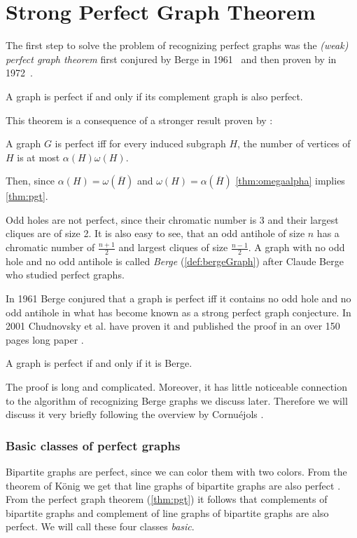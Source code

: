 \section{Strong Perfect Graph Theorem}
\label{sec:SPGT}

The first step to solve the problem of recognizing perfect graphs was the \emph{(weak) perfect graph theorem} first conjured by Berge in 1961~\cite{CB61} and then proven by \Lovasz in 1972~\cite{LL72}.

\begin{theorem}
	\label{thm:pgt}
	A graph is perfect if and only if its complement graph is also perfect.
\end{theorem}

This theorem is a consequence of a stronger result proven by \Lovasz:
\begin{theorem}
	\label{thm:omegaalpha}
	A graph $G$ is perfect iff for every induced subgraph $H$, the number of vertices of $H$ is at most $\alpha(H)\omega(H)$. 
\end{theorem}

Then, since $\alpha(H) = \omega(\overline{H})$ and $\omega(H) = \alpha(\overline{H})$ \cref{thm:omegaalpha} implies \cref{thm:pgt}.

Odd holes are not perfect, since their chromatic number is 3 and their largest cliques are of size 2. It is also easy to see, that an odd antihole of size $n$ has a chromatic number of $\frac{n+1}{2}$ and largest cliques of size $\frac{n-1}{2}$. A graph with no odd hole and no odd antihole is called \emph{Berge} (\cref{def:bergeGraph}) after Claude Berge who studied perfect graphs.

In 1961 Berge conjured that a graph is perfect iff it contains no odd hole and no odd antihole in what has become known as a strong perfect graph conjecture. In 2001 Chudnovsky et al. have proven it and published the proof in an over 150 pages long paper  \cite{MC06}.

\begin{theorem}
	\label{thm:spgt}
	A graph is perfect if and only if it is Berge.
\end{theorem}

The proof is long and complicated. Moreover, it has little noticeable connection to the algorithm of recognizing Berge graphs we discuss later. Therefore we will discuss it very briefly following the overview by Cornuéjols \cite{GC03}.

\subsubsection{Basic classes of perfect graphs}
Bipartite graphs are perfect, since we can color them with two colors. From the theorem of König we get that line graphs of bipartite graphs are also perfect \cite{Knig1916, GC03}. From the perfect graph theorem (\cref{thm:pgt}) it follows that complements of bipartite graphs and complement of line graphs of bipartite graphs are also perfect. We will call these four classes \emph{basic}.

